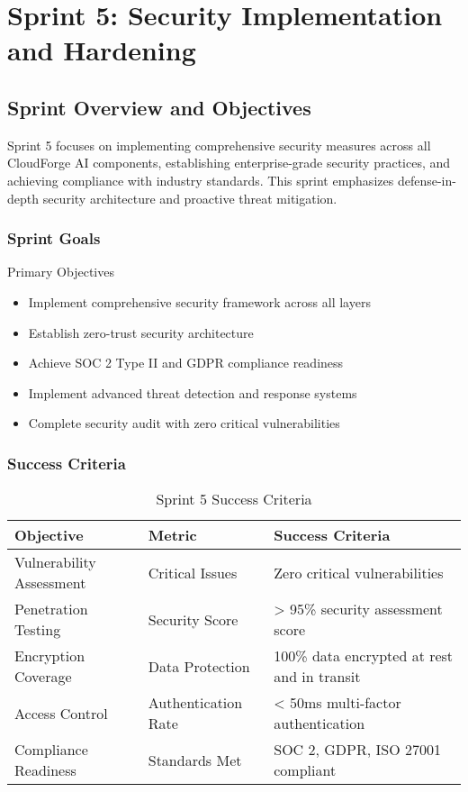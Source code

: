\chapter{Sprint 5: Security Implementation and Hardening}

\section{Sprint Overview and Objectives}

Sprint 5 focuses on implementing comprehensive security measures across all CloudForge AI components, establishing enterprise-grade security practices, and achieving compliance with industry standards. This sprint emphasizes defense-in-depth security architecture and proactive threat mitigation.

\subsection{Sprint Goals}

\begin{sprintbox}{Primary Objectives}
\begin{itemize}
    \item Implement comprehensive security framework across all layers
    \item Establish zero-trust security architecture
    \item Achieve SOC 2 Type II and GDPR compliance readiness
    \item Implement advanced threat detection and response systems
    \item Complete security audit with zero critical vulnerabilities
\end{itemize}
\end{sprintbox}

\subsection{Success Criteria}

\begin{table}[H]
\centering
\caption{Sprint 5 Success Criteria}
\begin{tabular}{|p{4cm}|p{3cm}|p{5cm}|}
\hline
\textbf{Objective} & \textbf{Metric} & \textbf{Success Criteria} \\
\hline
Vulnerability Assessment & Critical Issues & Zero critical vulnerabilities \\
\hline
Penetration Testing & Security Score & > 95\% security assessment score \\
\hline
Encryption Coverage & Data Protection & 100\% data encrypted at rest and in transit \\
\hline
Access Control & Authentication Rate & < 50ms multi-factor authentication \\
\hline
Compliance Readiness & Standards Met & SOC 2, GDPR, ISO 27001 compliant \\
\hline
\end{tabular}
\end{table}

